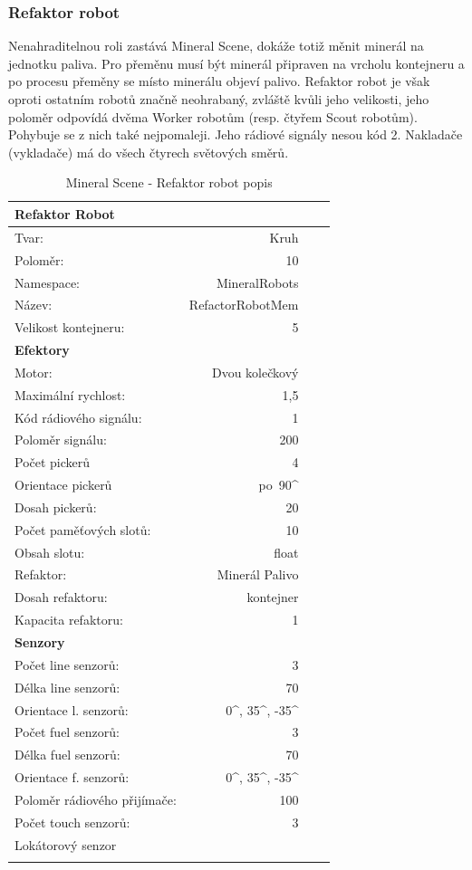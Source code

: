 \subsubsection{Refaktor robot}
Nenahraditelnou roli zastává Mineral Scene, dokáže totiž měnit minerál na jednotku paliva. Pro přeměnu musí být minerál připraven na vrcholu kontejneru a po procesu přeměny se místo minerálu objeví palivo. Refaktor robot je však oproti ostatním robotů značně neohrabaný, zvláště kvůli jeho velikosti, jeho poloměr odpovídá dvěma Worker robotům (resp. čtyřem Scout robotům). Pohybuje se z nich také nejpomaleji. Jeho rádiové signály nesou kód 2. Nakladače (vykladače) má do všech čtyrech světových směrů. 
\par  
\begin{table}[h]\centering
	\begin{tabular}{l@{\hspace{1.0cm}}D{.}{,}{2.2}D{.}{,}{2.2}D{.}{,}{2.3}}
		\toprule
		\textbf{Refaktor Robot} \\
		\midrule
		Tvar: & Kruh\\
		Poloměr: & 10 \\
		Namespace: & MineralRobots\\
		Název: & RefactorRobotMem \\
		Velikost kontejneru: & 5\\
		\midrule
		\textbf{Efektory} \\
		\midrule
		Motor: & Dvou kolečkový \\
		Maximální rychlost: & 1,5 \\
		Kód rádiového signálu: & 1\\
		Poloměr signálu: & 200\\
		Počet pickerů & 4\\
		Orientace pickerů & po\ 90^\circ\\ 
		Dosah pickerů: & 20\\
		Počet paměťových slotů: &10 \\
		Obsah slotu: & float\\
		Refaktor: & Minerál \Rightarrow Palivo \\
		Dosah refaktoru:  & kontejner \\
		Kapacita refaktoru: & 1\\ 
		\midrule 
		\textbf{Senzory} \\
		\midrule
		Počet line senzorů: &  3\\
		Délka line senzorů: & 70\\
		Orientace l. senzorů: & 0^\circ, 35^\circ, -35^\circ\\
		Počet fuel senzorů: &  3\\
		Délka fuel senzorů: & 70\\
		Orientace f. senzorů: & 0^\circ, 35^\circ, -35^\circ\\
		Poloměr rádiového přijímače: & 100 \\
		Počet touch senzorů: & 3 \\  
		Lokátorový senzor\\ 
		\bottomrule
	\end{tabular}
	\caption{Mineral Scene - Refaktor robot popis }
	\label{tab04:MineralRefactor}
\end{table}
\clearpage
